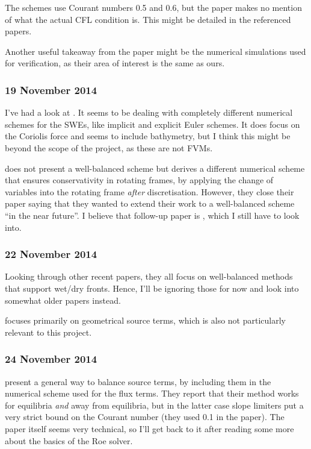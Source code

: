 \documentclass[a4paper,onecolumn,11pt]{report}
\begin{document}
The schemes use Courant numbers 0.5 and 0.6, but the paper makes no mention of what the actual CFL condition is. This might be detailed in the referenced papers.

Another useful takeaway from the paper might be the numerical simulations used for verification, as their area of interest is the same as ours.

\subsubsection*{19 November 2014}

I've had a look at \citet{walters2009useful}. It seems to be dealing with completely different numerical schemes for the SWEs, like implicit and explicit Euler schemes. It does focus on the Coriolis force and seems to include bathymetry, but I think this might be beyond the scope of the project, as these are not FVMs.

\citet{audusse2009conservative} does not present a well-balanced scheme but derives a different numerical scheme that ensures conservativity in rotating frames, by applying the change of variables into the rotating frame \emph{after} discretisation. However, they close their paper saying that they wanted to extend their work to a well-balanced scheme ``in the near future''. I believe that follow-up paper is \citet{audusse2011preservation}, which I still have to look into.

\subsubsection*{22 November 2014}

Looking through other recent papers, they all focus on well-balanced methods that support wet/dry fronts. Hence, I'll be ignoring those for now and look into somewhat older papers instead.

\citet{garcia2000numerical} focuses primarily on geometrical source terms, which is also not particularly relevant to this project.

\subsubsection*{24 November 2014}

\citet{hubbard2000flux} present a general way to balance source terms, by including them in the numerical scheme used for the flux terms. They report that their method works for equilibria \emph{and} away from equilibria, but in the latter case slope limiters put a very strict bound on the Courant number (they used 0.1 in the paper). The paper itself seems very technical, so I'll get back to it after reading some more about the basics of the Roe solver.
\end{document}
